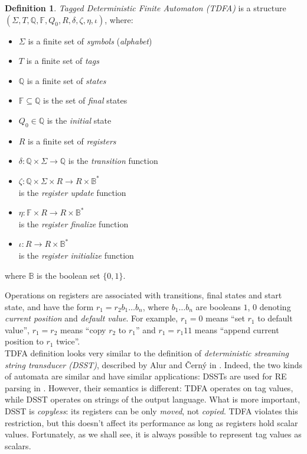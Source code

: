 \documentclass{article}
\newcommand{\Xeq}{\!=\!}
\newcommand{\YB}{\mathbb{B}}
\newcommand{\YF}{\mathbb{F}}
\newcommand{\YQ}{\mathbb{Q}}
\theoremstyle{definition}
\newtheorem{Xdef}{Definition}
\begin{document}
\begin{multicols}{2}
    \begin{Xdef}
    \emph{Tagged Deterministic Finite Automaton (TDFA)}
    is a structure $(\Sigma, T, \YQ, \YF, Q_0, R, \delta, \zeta, \eta, \iota)$, where:
    \begin{itemize}
    \setlength{\parskip}{0.5em}
        \item[] $\Sigma$ is a finite set of \emph{symbols} (\emph{alphabet})
        \item[] $T$ is a finite set of \emph{tags}
        \item[] $\YQ$ is a finite set of \emph{states}
        \item[] $\YF \subseteq \YQ$ is the set of \emph{final} states
        \item[] $Q_0 \in \YQ$ is the \emph{initial} state
        \item[] $R$ is a finite set of \emph{registers}
        \item[] $\delta: \YQ \times \Sigma \to \YQ$ is the \emph{transition} function
        \item[] $\zeta: \YQ \times \Sigma \times R \to R \times \YB^*$ \\
            is the \emph{register update} function
        \item[] $\eta: \YF \times R \to R \times \YB^*$ \\
            is the \emph{register finalize} function
        \item[] $\iota: R \to R \times \YB^*$ \\
            is the \emph{register initialize} function
    \end{itemize}
    where $\YB$ is the boolean set $\{0,1\}$.
    \end{Xdef}

Operations on registers are associated with transitions, final states and start state,
and have the form $r_1 \Xeq r_2 b_1 \dots b_n$, where $b_1 \dots b_n$ are booleans 
$1$, $0$ denoting \emph{current position} and \emph{default value}.
For example, $r_1 \Xeq 0$ means ``set $r_1$ to default value'',
$r_1 \Xeq r_2$ means ``copy $r_2$ to $r_1$'' and
$r_1 \Xeq r_1 1 1$ means ``append current position to $r_1$ twice''.
\\

TDFA definition looks very similar to the definition of
\emph{deterministic streaming string transducer (DSST)}, described by Alur and Černý in \cite{AC11}.
Indeed, the two kinds of automata are similar and have similar applications: DSSTs are used for RE parsing in \cite{Gra15}.
However, their semantics is different: TDFA operates on tag values, while DSST operates on strings of the output language.
What is more important, DSST is \emph{copyless}:
its registers can be only \emph{moved}, not \emph{copied}.
TDFA violates this restriction, but this doesn't affect its performance as long as registers hold scalar values.
Fortunately, as we shall see, it is always possible to represent tag values as scalars.
\\


\end{multicols}
\end{document}
